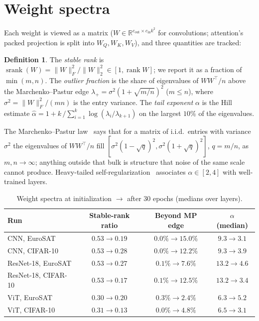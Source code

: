 \documentclass[11pt]{article}
\theoremstyle{definition}
\newtheorem{definition}{Definition}
\newcommand{\R}{\mathbb{R}}
\newcommand{\srank}{\operatorname{srank}}
\begin{document}
\section{Weight spectra}
\label{sec:spectra}

Each weight is viewed as a matrix ($W \in \R^{c_{\text{out}} \times c_{\text{in}}k^2}$ for
convolutions; attention's packed projection is split into $W_Q, W_K, W_V$), and three
quantities are tracked:

\begin{definition}
The \emph{stable rank} is $\srank(W) = \|W\|_F^2/\|W\|_2^2 \in [1, \operatorname{rank} W]$; we report it
as a fraction of $\min(m,n)$. The \emph{outlier fraction} is the share of eigenvalues of
$WW^\top/n$ above the Marchenko--Pastur edge $\lambda_+ = \sigma^2(1+\sqrt{m/n})^2$ ($m \le n$),
where $\sigma^2 = \|W\|_F^2/(mn)$ is the entry variance. The \emph{tail exponent} $\alpha$ is the
Hill estimate $\hat\alpha = 1 + k\,/\sum_{i=1}^{k}\log(\lambda_i/\lambda_{k+1})$ on the largest
$10\%$ of the eigenvalues.
\end{definition}

The Marchenko--Pastur law~\cite{marchenko1967} says that for a matrix of i.i.d.\ entries with
variance $\sigma^2$ the eigenvalues of $WW^\top/n$ fill $[\sigma^2(1-\sqrt q)^2,\sigma^2(1+\sqrt
q)^2]$, $q = m/n$, as $m,n\to\infty$; anything outside that bulk is structure that noise of the same
scale cannot produce. Heavy-tailed self-regularization~\cite{martin2021} associates
$\alpha \in [2,4]$ with well-trained layers.

\begin{table}[t]
\centering
\begin{tabular}{lccc}
\toprule
Run & Stable-rank ratio & Beyond MP edge & $\alpha$ (median) \\
\midrule
CNN, EuroSAT & $0.53 \to 0.19$ & $0.0\% \to 15.0\%$ & $9.3 \to 3.1$ \\
CNN, CIFAR-10 & $0.53 \to 0.28$ & $0.0\% \to 12.2\%$ & $9.3 \to 3.9$ \\
ResNet-18, EuroSAT & $0.53 \to 0.27$ & $0.1\% \to 7.6\%$ & $13.2 \to 4.6$ \\
ResNet-18, CIFAR-10 & $0.53 \to 0.17$ & $0.1\% \to 12.5\%$ & $13.2 \to 3.4$ \\
ViT, EuroSAT & $0.30 \to 0.20$ & $0.3\% \to 2.4\%$ & $6.3 \to 5.2$ \\
ViT, CIFAR-10 & $0.31 \to 0.13$ & $0.0\% \to 4.8\%$ & $6.5 \to 3.1$ \\
\bottomrule
\end{tabular}
\caption{Weight spectra at initialization $\to$ after 30 epochs (medians over layers).}
\label{tab:spectra}
\end{table}
\end{document}
